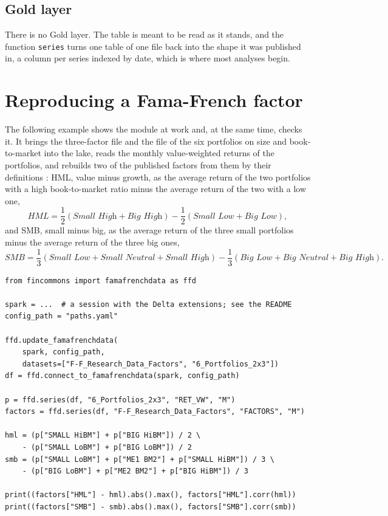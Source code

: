 \subsection{Gold layer}

There is no Gold layer. The table is meant to be read as it stands, and the function \verb|series| turns one table of one file back into the shape it was published in, a column per series indexed by date, which is where most analyses begin.

\section{Reproducing a Fama-French factor}

The following example shows the module at work and, at the same time, checks it. It brings the three-factor file and the file of the six portfolios on size and book-to-market into the lake, reads the monthly value-weighted returns of the portfolios, and rebuilds two of the published factors from them by their definitions \parencite{Fama.1993}: HML, value minus growth, as the average return of the two portfolios with a high book-to-market ratio minus the average return of the two with a low one,
$$HML = \frac{1}{2}\left(\textit{Small High} + \textit{Big High}\right) - \frac{1}{2}\left(\textit{Small Low} + \textit{Big Low}\right),$$
and SMB, small minus big, as the average return of the three small portfolios minus the average return of the three big ones,
$$SMB = \frac{1}{3}\left(\textit{Small Low} + \textit{Small Neutral} + \textit{Small High}\right) - \frac{1}{3}\left(\textit{Big Low} + \textit{Big Neutral} + \textit{Big High}\right).$$

\begin{verbatim}
from fincommons import famafrenchdata as ffd

spark = ...  # a session with the Delta extensions; see the README
config_path = "paths.yaml"

ffd.update_famafrenchdata(
    spark, config_path,
    datasets=["F-F_Research_Data_Factors", "6_Portfolios_2x3"])
df = ffd.connect_to_famafrenchdata(spark, config_path)

p = ffd.series(df, "6_Portfolios_2x3", "RET_VW", "M")
factors = ffd.series(df, "F-F_Research_Data_Factors", "FACTORS", "M")

hml = (p["SMALL HiBM"] + p["BIG HiBM"]) / 2 \
    - (p["SMALL LoBM"] + p["BIG LoBM"]) / 2
smb = (p["SMALL LoBM"] + p["ME1 BM2"] + p["SMALL HiBM"]) / 3 \
    - (p["BIG LoBM"] + p["ME2 BM2"] + p["BIG HiBM"]) / 3

print((factors["HML"] - hml).abs().max(), factors["HML"].corr(hml))
print((factors["SMB"] - smb).abs().max(), factors["SMB"].corr(smb))
\end{verbatim}

